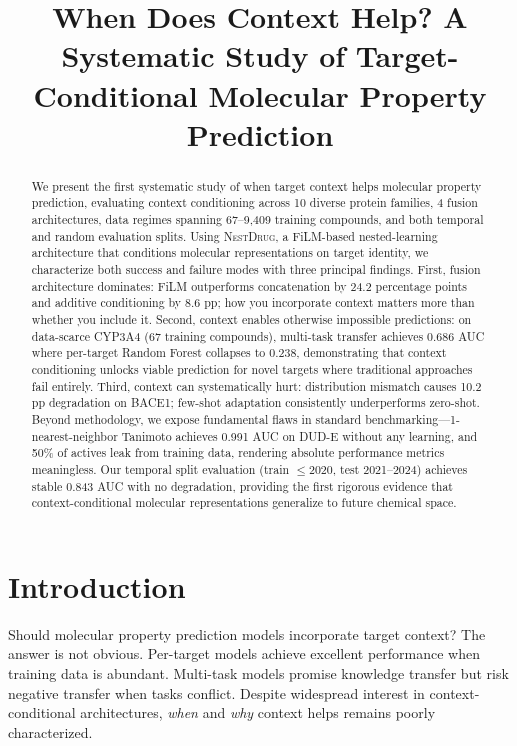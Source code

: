 \documentclass{article}
\title{When Does Context Help? A Systematic Study of Target-Conditional Molecular Property Prediction}
\author{}
\newcommand{\methodname}{\textsc{NestDrug}}
\begin{document}
\maketitle

\begin{abstract}
We present the first systematic study of when target context helps molecular property prediction, evaluating context conditioning across 10 diverse protein families, 4 fusion architectures, data regimes spanning 67--9,409 training compounds, and both temporal and random evaluation splits. Using \methodname{}, a FiLM-based nested-learning architecture that conditions molecular representations on target identity, we characterize both success and failure modes with three principal findings. First, fusion architecture dominates: FiLM outperforms concatenation by 24.2 percentage points and additive conditioning by 8.6 pp; how you incorporate context matters more than whether you include it. Second, context enables otherwise impossible predictions: on data-scarce CYP3A4 (67 training compounds), multi-task transfer achieves 0.686 AUC where per-target Random Forest collapses to 0.238, demonstrating that context conditioning unlocks viable prediction for novel targets where traditional approaches fail entirely. Third, context can systematically hurt: distribution mismatch causes 10.2 pp degradation on BACE1; few-shot adaptation consistently underperforms zero-shot. Beyond methodology, we expose fundamental flaws in standard benchmarking---1-nearest-neighbor Tanimoto achieves 0.991 AUC on DUD-E without any learning, and 50\% of actives leak from training data, rendering absolute performance metrics meaningless. Our temporal split evaluation (train $\leq$2020, test 2021--2024) achieves stable 0.843 AUC with no degradation, providing the first rigorous evidence that context-conditional molecular representations generalize to future chemical space.
\end{abstract}

\section{Introduction}
\label{sec:intro}

Should molecular property prediction models incorporate target context? The answer is not obvious. Per-target models achieve excellent performance when training data is abundant. Multi-task models promise knowledge transfer but risk negative transfer when tasks conflict. Despite widespread interest in context-conditional architectures, \textit{when} and \textit{why} context helps remains poorly characterized.
\end{document}
